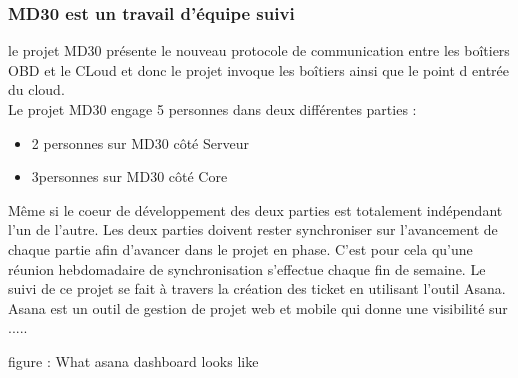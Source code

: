         \subsubsection{MD30 est un travail d'équipe suivi}

        le projet MD30 présente le nouveau protocole de communication entre les boîtiers OBD et le CLoud et donc le projet 
        invoque les boîtiers ainsi que le point d entrée du cloud. \\ [0.3cm]
        Le projet MD30 engage 5 personnes dans deux différentes parties : 
        \begin{itemize}
            \renewcommand{\labelitemi}{$\bullet$}
            \item 2 personnes sur MD30 côté Serveur
            \item 3personnes sur MD30 côté Core
        \end{itemize} 
         
        \vspace{0.2cm}
        
        Même si le coeur de développement des deux parties est totalement indépendant l’un de l'autre. Les deux parties doivent 
        rester synchroniser sur l'avancement de chaque partie afin d'avancer dans le projet en phase. C'est pour cela qu'une réunion  
        hebdomadaire de synchronisation s'effectue chaque fin de semaine. 
        Le suivi de ce projet se fait à travers la création des ticket en utilisant l'outil Asana.\\

        Asana est un outil de gestion de projet web et mobile qui donne une visibilité sur  ..... 
        

        figure : What asana dashboard looks like 